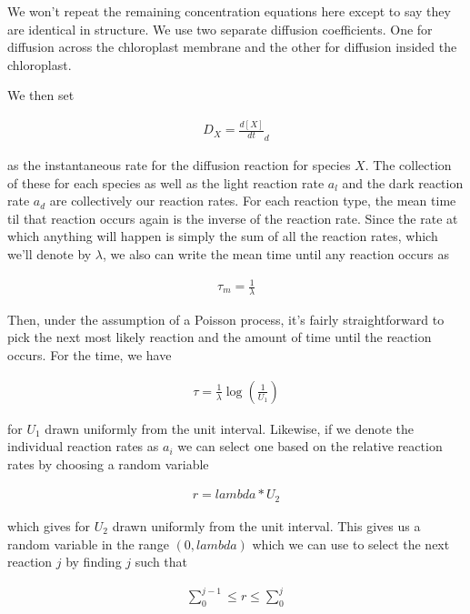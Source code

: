 \documentclass[12pt,reqno]{amsart}
\begin{document}
    We won't repeat the remaining concentration equations here except to say they are
    identical in structure.  We use two separate diffusion coefficients.  One for 
    diffusion across the chloroplast membrane and the other for diffusion insided
    the chloroplast.  
    
    We then set 
    
    \begin{align*}
        D_X = \frac{d[X]}{dt}_d
    \end{align*}
    
    as the instantaneous rate for the diffusion reaction for species $X$.  
    The collection of these for each species as well as the light reaction
    rate $a_l$ and the dark reaction rate $a_d$ are collectively our reaction 
    rates.  For each reaction type, the mean time til that reaction occurs again
    is the inverse of the reaction rate.  Since the rate at which anything
    will happen is simply the sum of all the reaction rates, which we'll denote
    by $\lambda$, we also can write the mean time until any reaction occurs as   
        
    \begin{align*}
        \tau_m = \frac{1}{\lambda}    
    \end{align*}
    
    Then, under the assumption of a Poisson process, it's fairly straightforward
    to pick the next most likely reaction and the amount of time until
    the reaction occurs. For the time, we have
    
    \begin{align*}
        \tau = \frac{1}{\lambda}\log(\frac{1}{U_1})
    \end{align*}
    
    for $U_1$ drawn uniformly from the unit interval.  Likewise, if we denote
    the individual reaction rates as $a_i$ we can select one based on the
    relative reaction rates by choosing a random variable
    
    \begin{align*}
        r = lambda*U_2
    \end{align*}
    
    which gives for $U_2$ drawn uniformly from the unit interval. This gives us
    a random variable in the range $(0, lambda)$  which we can use to select
    the next reaction $j$ by finding $j$ such that
    
    \begin{align*}
        \sum\limits_0^{j-1} \leq r \leq \sum\limits_0^j
    \end{align*}
    
\end{document}
